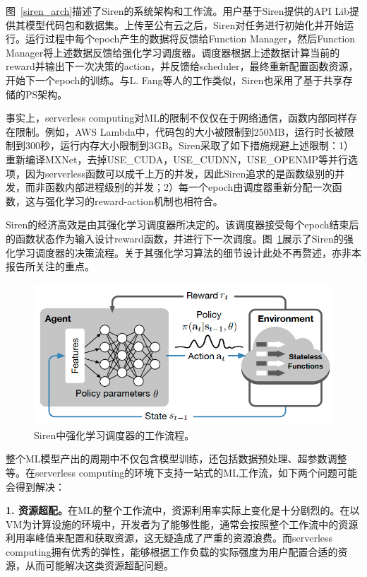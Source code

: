 图~\ref{siren_arch}描述了Siren的系统架构和工作流。用户基于Siren提供的API Lib提供其模型代码包和数据集。上传至公有云之后，Siren对任务进行初始化并开始运行。运行过程中每个epoch产生的数据将反馈给Function Manager，然后Function Manager将上述数据反馈给强化学习调度器。调度器根据上述数据计算当前的reward并输出下一次决策的action，并反馈给scheduler，最终重新配置函数资源，开始下一个epoch的训练。与L. Fang等人的工作类似，Siren也采用了基于共享存储的PS架构。

事实上，serverless computing对ML的限制不仅仅在于网络通信，函数内部同样存在限制。例如，AWS Lambda中，代码包的大小被限制到250MB，运行时长被限制到300秒，运行内存大小限制到3GB。Siren采取了如下措施规避上述限制：1）重新编译MXNet，去掉USE\_CUDA，USE\_CUDNN，USE\_OPENMP等并行选项，因为serverless函数可以成千上万的并发，因此Siren追求的是函数级别的并发，而非函数内部进程级别的并发；2）每一个epoch由调度器重新分配一次函数，这与强化学习的reward-action机制也相符合。

Siren的经济高效是由其强化学习调度器所决定的。该调度器接受每个epoch结束后的函数状态作为输入设计reward函数，并进行下一次调度。图~\ref{drl_siren}展示了Siren的强化学习调度器的决策流程。关于其强化学习算法的细节设计此处不再赘述，亦非本报告所关注的重点。

\begin{figure}[h]
    \centerline{\includegraphics[width=\textwidth]{figures/drl-siren.png}}
    \caption{Siren中强化学习调度器的工作流程。}
    \label{drl_siren}
\end{figure}

整个ML模型产出的周期中不仅包含模型训练，还包括数据预处理、超参数调整等。在serverless computing的环境下支持一站式的ML工作流，如下两个问题可能会得到解决：

\textbf{1. 资源超配。}在ML的整个工作流中，资源利用率实际上变化是十分剧烈的。在以VM为计算设施的环境中，开发者为了能够性能，通常会按照整个工作流中的资源利用率峰值来配置和获取资源，这无疑造成了严重的资源浪费。而serverless computing拥有优秀的弹性，能够根据工作负载的实际强度为用户配置合适的资源，从而可能解决这类资源超配问题。

